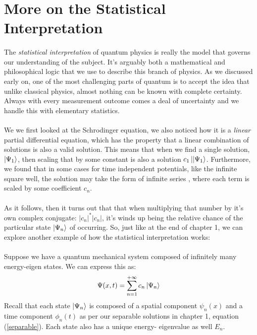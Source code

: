 \documentclass[12pt,letterpaper]{book}
\begin{document}
\section{More on the Statistical Interpretation}

\paragraph*{}The \textit{statistical interpretation} of quantum physics is really the model that governs our understanding of the subject. It's arguably both a mathematical and philosophical logic that we use to describe this branch of physics. As we discussed early on, one of the most challenging parts of quantum is to accept the idea that unlike classical physics, almost nothing can be known with complete certainty. Always with every measurement outcome comes a deal of uncertainty and we handle this with elementary statistics.
\paragraph*{}We we first looked at the Schrodinger equation, we also noticed how it is a \textit{linear} partial differential equation, which has the property that a linear combination of solutions is also a valid solution. This means that when we find a single solution, $\ket{\Psi_1}$, then scaling that by some constant is also a solution $c_1\ket{|\Psi_1}$. Furthermore, we found that in some cases for time independent potentials, like the infinite square well, the solution may take the form of infinite series , where each term is scaled by some coefficient $c_n$. 
\paragraph*{}As it follows, then it turns out that that when multiplying that number by it's own complex conjugate: $|c_n|^*|c_n|$, it's winds up being the relative chance of the particular state $\ket{\Psi_n}$ of occurring. So, just like at the end of chapter 1, we can explore another example of how the statistical interpretation works: \\
\paragraph*{}Suppose we have a quantum mechanical system composed of infinitely many energy-eigen states. We can express this as:
\begin{equation}
\Psi(x,t) = \sum_{n=1}^{+\infty} c_n \ket{\Psi_n}
\end{equation}
Recall that each state $\ket{\Psi_n}$ is composed of a spatial component $\psi_n(x)$ and a time component $\phi_n(t)$ as per our separable solutions in chapter 1, equation (\ref{separable}). Each state also has a unique energy- eigenvalue as well $E_n$.
\end{document}
